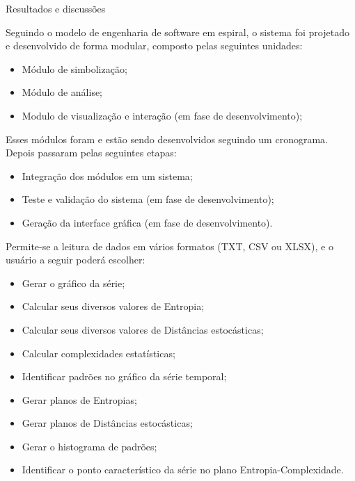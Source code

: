 \documentclass[final]{beamer}
\newlength{\onecolwid}
\begin{document}
\begin{frame}[t]
\begin{columns}[t]
\begin{column}{\onecolwid}
\begin{block}{Resultados e discussões}
\small

\quad Seguindo o modelo de engenharia de software em espiral, o sistema foi projetado e desenvolvido de forma modular, composto pelas seguintes unidades:

\begin{itemize}[leftmargin=1.0in]
\item Módulo de simbolização;
\item Módulo de análise;
\item Modulo de visualização e interação (em fase de desenvolvimento);
\end{itemize}

Esses módulos foram e estão sendo desenvolvidos seguindo um cronograma. Depois passaram pelas seguintes etapas:

\begin{itemize}[leftmargin=1.0in]
\item Integração dos módulos em um sistema;
\item Teste e validação do sistema (em fase de desenvolvimento);
\item Geração da interface gráfica (em fase de desenvolvimento).
\end{itemize}

Permite-se a leitura de dados em vários formatos (TXT, CSV ou XLSX), e o usuário a seguir poderá escolher:

\begin{itemize}[leftmargin=1.0in]
	\item[\HandRight] Gerar o gráfico da série;
	\item[\HandRight] Calcular seus diversos valores de Entropia;
	\item[\HandRight] Calcular seus diversos valores de Distâncias estocásticas;
	\item[\HandRight] Calcular complexidades estatísticas;
    \item[\HandRight] Identificar padrões no gráfico da série temporal;
    \item[\HandRight] Gerar planos de Entropias;
    \item[\HandRight] Gerar planos de Distâncias estocásticas;
	\item[\HandRight] Gerar o histograma de padrões;
	\item[\HandRight] Identificar o ponto característico da série no plano Entropia-Complexidade.
\end{itemize}


\end{block}
\end{column}
\end{columns}
\end{frame}
\end{document}

